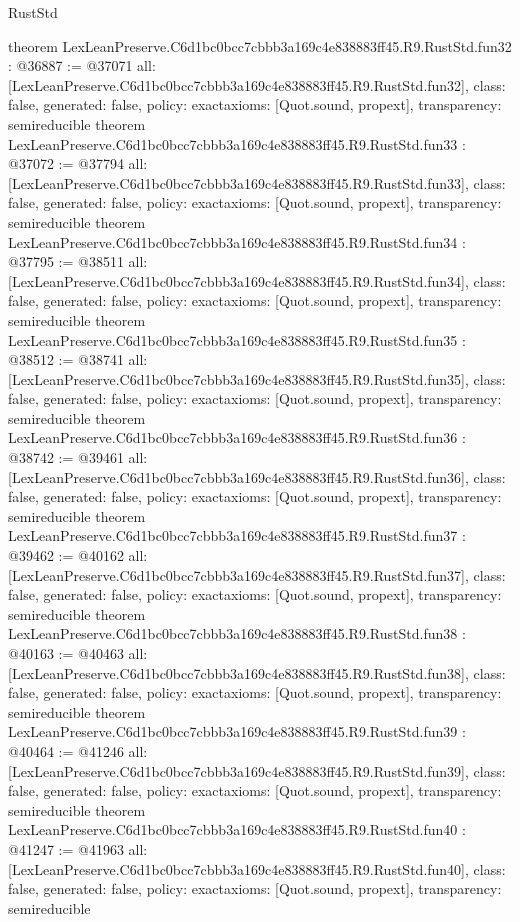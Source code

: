 \begin{lexlean}{RustStd}
\begin{coremodule}
{}
theorem LexLeanPreserve.C6d1bc0bcc7cbbb3a169c4e838883ff45.R9.RustStd.fun32 : @36887 := @37071 {
  all: [LexLeanPreserve.C6d1bc0bcc7cbbb3a169c4e838883ff45.R9.RustStd.fun32],
  class: false,
  generated: false,
  policy: exact{axioms: [Quot.sound, propext]},
  transparency: semireducible
}
theorem LexLeanPreserve.C6d1bc0bcc7cbbb3a169c4e838883ff45.R9.RustStd.fun33 : @37072 := @37794 {
  all: [LexLeanPreserve.C6d1bc0bcc7cbbb3a169c4e838883ff45.R9.RustStd.fun33],
  class: false,
  generated: false,
  policy: exact{axioms: [Quot.sound, propext]},
  transparency: semireducible
}
theorem LexLeanPreserve.C6d1bc0bcc7cbbb3a169c4e838883ff45.R9.RustStd.fun34 : @37795 := @38511 {
  all: [LexLeanPreserve.C6d1bc0bcc7cbbb3a169c4e838883ff45.R9.RustStd.fun34],
  class: false,
  generated: false,
  policy: exact{axioms: [Quot.sound, propext]},
  transparency: semireducible
}
theorem LexLeanPreserve.C6d1bc0bcc7cbbb3a169c4e838883ff45.R9.RustStd.fun35 : @38512 := @38741 {
  all: [LexLeanPreserve.C6d1bc0bcc7cbbb3a169c4e838883ff45.R9.RustStd.fun35],
  class: false,
  generated: false,
  policy: exact{axioms: [Quot.sound, propext]},
  transparency: semireducible
}
theorem LexLeanPreserve.C6d1bc0bcc7cbbb3a169c4e838883ff45.R9.RustStd.fun36 : @38742 := @39461 {
  all: [LexLeanPreserve.C6d1bc0bcc7cbbb3a169c4e838883ff45.R9.RustStd.fun36],
  class: false,
  generated: false,
  policy: exact{axioms: [Quot.sound, propext]},
  transparency: semireducible
}
theorem LexLeanPreserve.C6d1bc0bcc7cbbb3a169c4e838883ff45.R9.RustStd.fun37 : @39462 := @40162 {
  all: [LexLeanPreserve.C6d1bc0bcc7cbbb3a169c4e838883ff45.R9.RustStd.fun37],
  class: false,
  generated: false,
  policy: exact{axioms: [Quot.sound, propext]},
  transparency: semireducible
}
theorem LexLeanPreserve.C6d1bc0bcc7cbbb3a169c4e838883ff45.R9.RustStd.fun38 : @40163 := @40463 {
  all: [LexLeanPreserve.C6d1bc0bcc7cbbb3a169c4e838883ff45.R9.RustStd.fun38],
  class: false,
  generated: false,
  policy: exact{axioms: [Quot.sound, propext]},
  transparency: semireducible
}
theorem LexLeanPreserve.C6d1bc0bcc7cbbb3a169c4e838883ff45.R9.RustStd.fun39 : @40464 := @41246 {
  all: [LexLeanPreserve.C6d1bc0bcc7cbbb3a169c4e838883ff45.R9.RustStd.fun39],
  class: false,
  generated: false,
  policy: exact{axioms: [Quot.sound, propext]},
  transparency: semireducible
}
theorem LexLeanPreserve.C6d1bc0bcc7cbbb3a169c4e838883ff45.R9.RustStd.fun40 : @41247 := @41963 {
  all: [LexLeanPreserve.C6d1bc0bcc7cbbb3a169c4e838883ff45.R9.RustStd.fun40],
  class: false,
  generated: false,
  policy: exact{axioms: [Quot.sound, propext]},
  transparency: semireducible
}
\end{coremodule}
\end{lexlean}
